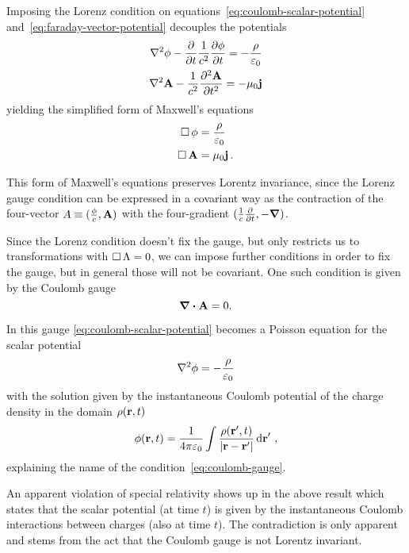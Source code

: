 \documentclass[12pt, class=report, crop=false]{standalone}
\begin{document}
Imposing the Lorenz condition on equations~\eqref{eq:coulomb-scalar-potential}
and~\eqref{eq:faraday-vector-potential} decouples the potentials
\begin{align*}
  \laplacian{\phi} - \pdv{t} \frac{1}{c^2} \pdv{\phi}{t} = -\frac{\rho}{\varepsilon_0} \\
  \laplacian{\vb{A}} - \frac{1}{c^2}\pdv[2]{\vb{A}}{t} = -\mu_0 \vb{j}
\end{align*}
yielding the simplified form of Maxwell's equations
\begin{align*}
  \operatorname{\Box} \phi &= \frac{\rho}{\varepsilon_0} \\
  \operatorname{\Box} \vb{A} &= \mu_0 \vb{j}\,.
\end{align*}

This form of Maxwell's equations preserves Lorentz invariance, since the Lorenz
gauge condition can be expressed in a covariant way as the contraction of the
four-vector \(A \equiv (\frac{\phi}{c}, \vb{A})\) with the four-gradient
\((\frac{1}{c}\pdv{t}, -\grad)\).

Since the Lorenz condition doesn't fix the gauge, but only restricts us to
transformations with \(\operatorname{\Box} \Lambda = 0\), we can impose further conditions
in order to fix the gauge, but in general those will not be covariant.
One such condition is given by the Coulomb gauge
\begin{equation}
  \label{eq:coulomb-gauge}
  \div{\vb{A}} = 0.
\end{equation}

In this gauge \cref{eq:coulomb-scalar-potential} becomes a Poisson equation
for the scalar potential
\begin{equation}
  \label{eq:coulomb-poisson}
  \laplacian{\phi} = -\frac{\rho}{\varepsilon_0}
\end{equation}
with the solution given by the instantaneous Coulomb potential of the charge
density in the domain \(\rho(\vb{r},t)\)
\begin{equation}
  \label{eq:scalar-potential-solution}
  \phi(\vb{r},t) = \frac{1}{4\pi \varepsilon_0} \int \frac{\rho(\vb{r}',t)}{|\vb{r}-\vb{r}'|} \dd{\vb{r}}'\,,
\end{equation}
explaining the name of the condition~\eqref{eq:coulomb-gauge}.

An apparent violation of special relativity shows up in the above result which
states that the scalar potential (at time \(t\)) is given by the instantaneous Coulomb
interactions between charges (also at time \(t\)). The contradiction is only
apparent and stems from the act that the Coulomb gauge is not Lorentz invariant.
\end{document}
